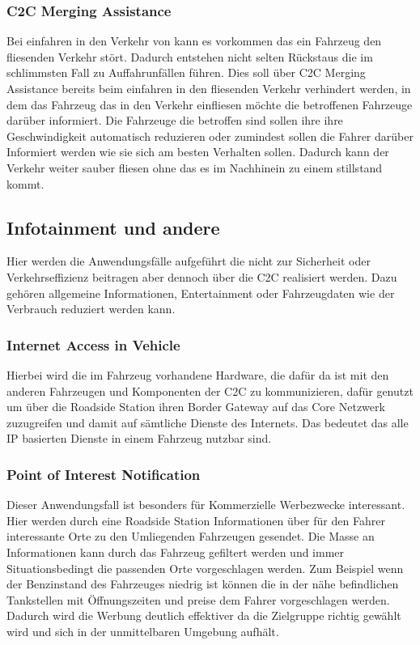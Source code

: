 \subsubsection{C2C Merging Assistance}
Bei einfahren in den Verkehr von kann es vorkommen das ein Fahrzeug den fliesenden Verkehr stört. Dadurch entstehen nicht selten Rückstaus die im schlimmsten Fall zu Auffahrunfällen führen. Dies soll über C2C Merging Assistance bereits beim einfahren in den fliesenden Verkehr verhindert werden, in dem das Fahrzeug das in den Verkehr einfliesen möchte die betroffenen Fahrzeuge darüber informiert. Die Fahrzeuge die betroffen sind sollen ihre ihre Geschwindigkeit automatisch reduzieren oder zumindest sollen die Fahrer darüber Informiert werden wie sie sich am besten Verhalten sollen. Dadurch kann der Verkehr weiter sauber fliesen ohne das es im Nachhinein zu einem stillstand kommt. 

\subsection{Infotainment und andere}
Hier werden die Anwendungsfälle aufgeführt die nicht zur Sicherheit oder Verkehrseffizienz beitragen aber dennoch über die \acl{C2C} realisiert werden. Dazu gehören allgemeine Informationen, Entertainment oder Fahrzeugdaten wie der Verbrauch reduziert werden kann. 

\subsubsection{Internet Access in Vehicle}
Hierbei wird die im Fahrzeug vorhandene Hardware, die dafür da ist mit den anderen Fahrzeugen und Komponenten der \acl{C2C} zu kommunizieren, dafür genutzt um über die Roadside Station ihren Border Gateway auf das Core Netzwerk zuzugreifen und damit auf sämtliche Dienste des Internets. Das bedeutet das alle IP basierten Dienste in einem Fahrzeug nutzbar sind.  

\subsubsection{Point of Interest Notification}
Dieser Anwendungsfall ist besonders für Kommerzielle Werbezwecke interessant. Hier werden durch eine Roadside Station Informationen über für den Fahrer interessante Orte zu den Umliegenden Fahrzeugen gesendet. Die Masse an Informationen kann durch das Fahrzeug gefiltert werden und immer Situationsbedingt die passenden Orte vorgeschlagen werden. Zum Beispiel wenn der Benzinstand des Fahrzeuges niedrig ist können die in der nähe befindlichen Tankstellen mit Öffnungszeiten und preise dem Fahrer vorgeschlagen werden. Dadurch wird die Werbung deutlich effektiver da die Zielgruppe richtig gewählt wird und sich in der unmittelbaren Umgebung aufhält.

